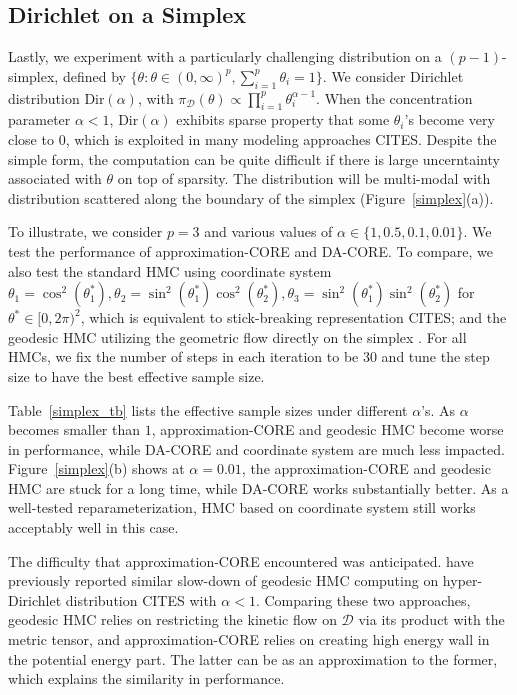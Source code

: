 \documentclass[10pt,fleqn]{article}
\newcommand{\mc}[1]{\mathcal{#1}}
\DeclareMathOperator{\1}{\mathbbm{1}}
\begin{document}
\subsection{Dirichlet on a Simplex}
Lastly, we experiment with a particularly challenging distribution on a 
$(p-1)$-simplex, defined by $\{\theta: \theta\in(0,\infty)^p,\sum_{i=1}^p \theta_i=1\}$. We consider Dirichlet distribution $\text{Dir}(\alpha)$, with
$\pi_{\mc D}(\theta)\propto \prod_{i=1}^p\theta_i^{\alpha-1}$. When the concentration
parameter $\alpha<1$, $\text{Dir}(\alpha)$ exhibits sparse property that some $\theta_i$'s become very close to $0$, which is exploited in many modeling
approaches CITES. Despite the simple form, the computation can be quite difficult
 if there is large uncerntainty associated with $\theta$ on top of sparsity.
 The distribution will be multi-modal with distribution scattered along the boundary of the simplex (Figure~\ref{simplex}(a)).

To illustrate, we consider $p=3$ and various values of $\alpha\in \{1,0.5,0.1,0.01\}$. We test the performance of approximation-CORE and DA-CORE. To compare, we also test the standard HMC using coordinate
system $\theta_1=\cos^2(\theta_1^*), \theta_2=\sin^2(\theta_1^*)\cos^2(\theta_2^*), \theta_3=\sin^2(\theta_1^*)\sin^2(\theta_2^*)$ for $\theta^*\in [0,2\pi)^2$,
which is equivalent to stick-breaking representation CITES; and the geodesic
HMC utilizing the geometric flow directly on the simplex \citep{byrne2013geodesic}.
For all HMCs, we fix the number of steps in each iteration to be $30$ and tune the step size to have the best effective sample size.

Table~\ref{simplex_tb} lists the effective sample sizes under different $\alpha$'s.
As $\alpha$ becomes smaller than $1$, approximation-CORE and geodesic HMC become worse in performance, while DA-CORE
 and coordinate system are much less impacted.
Figure~\ref{simplex}(b) shows at $\alpha=0.01$, the approximation-CORE and geodesic
HMC are stuck for a long time, while DA-CORE works substantially better. As a well-tested reparameterization,  HMC based on coordinate system still works acceptably well in this case.

The difficulty that approximation-CORE encountered was  anticipated. \cite{byrne2013geodesic} have previously reported similar
slow-down of geodesic HMC computing on hyper-Dirichlet  distribution CITES with $\alpha<1$. Comparing these two approaches, geodesic HMC relies on restricting the kinetic flow on $\mc D$ via its product with the metric tensor, and approximation-CORE relies
on creating high energy wall in the potential energy part. The latter can
be as an approximation
to the former, which explains the similarity in performance.
\end{document}

